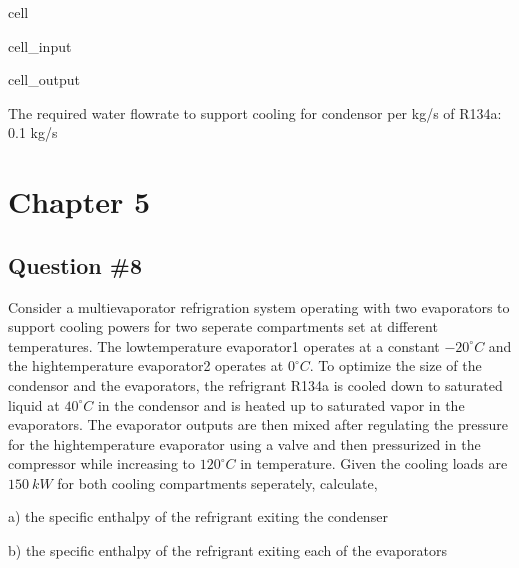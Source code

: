 \documentclass[letterpaper,10pt,english]{jupyterBook}
\begin{document}
\begin{sphinxuseclass}{cell}
\begin{sphinxVerbatimInput}
\begin{sphinxuseclass}{cell_input}
\end{sphinxuseclass}\end{sphinxVerbatimInput}
\begin{sphinxVerbatimOutput}

\begin{sphinxuseclass}{cell_output}
\begin{sphinxVerbatim}[commandchars=\\\{\}]
The required water flow\PYGZhy{}rate to support cooling for condensor per kg/s of R134a: 0.1 kg/s
\end{sphinxVerbatim}

\end{sphinxuseclass}\end{sphinxVerbatimOutput}

\end{sphinxuseclass}
\sphinxstepscope


\section{Chapter 5}
\label{\detokenize{notebooks/Chapter5/CH5-Q8:chapter-5}}\label{\detokenize{notebooks/Chapter5/CH5-Q8::doc}}

\subsection{Question \#8}
\label{\detokenize{notebooks/Chapter5/CH5-Q8:question-8}}
\sphinxAtStartPar
Consider a multi\sphinxhyphen{}evaporator refrigration system operating with two evaporators to support cooling powers for two seperate compartments set at different temperatures. The low\sphinxhyphen{}temperature evaporator1 operates at a constant \(-20^{\circ} C\) and the high\sphinxhyphen{}temperature evaporator2 operates at \(0^{\circ} C\). To optimize the size of the condensor and the evaporators, the refrigrant R134\sphinxhyphen{}a is cooled down to saturated liquid at \(40^{\circ} C\) in the condensor and is heated up to saturated vapor in the evaporators. The evaporator outputs are then mixed after regulating the pressure for the high\sphinxhyphen{}temperature evaporator using a valve and then pressurized in the compressor while increasing to \(120^{\circ} C\) in temperature. Given the cooling loads are \(150\:kW\) for both cooling compartments seperately, calculate,

\sphinxAtStartPar
a) the specific enthalpy of the refrigrant exiting the condenser

\sphinxAtStartPar
b) the specific enthalpy of the refrigrant exiting each of the evaporators
\end{document}
